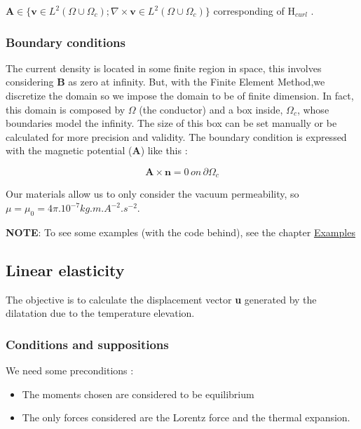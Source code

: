 \documentclass[11pt]{amsart}
\newcommand{\admonition}[2]{\textbf{#1}: {#2}}
\begin{document}
$\textbf{A}\in\{\textbf{v}\in L^{2}(\Omega\cup\Omega_{c}); \nabla\times\textbf{v}\in L^{2}(\Omega\cup\Omega_{c})\}$
corresponding of H${}_{curl}$ .


\hypertarget{x-boundary-conditions}{\subsubsection{Boundary conditions}}
The current density is located in some finite region in space, this involves considering \textbf{B} as zero at infinity.
But, with the Finite Element Method,we discretize the domain so we impose the domain to be of finite dimension.
In fact, this domain is composed by $\Omega$ (the conductor) and a box inside, $\Omega_{c}$, whose boundaries model the infinity.
The size of this box can be set manually or be calculated for more precision and validity.
The boundary condition is expressed with the magnetic potential (\textbf{A}) like this :



\[
\textbf{A}\times\textbf{n}=0\, on\, \partial\Omega_{c}
\]



Our materials allow us to only consider the vacuum permeability, so $\mu=\mu_{0}=4\pi.10^{-7} kg.m.A^{-2} .s^{-2}$.


\admonition{NOTE}{To see some examples (with the code behind), see the chapter \href{/examples}{Examples}}
\hypertarget{x-linear-elasticity}{\subsection{Linear elasticity}}
The objective is to calculate the displacement vector \textbf{u} generated by the dilatation due to the temperature elevation.


\hypertarget{x-conditions-and-suppositions}{\subsubsection{Conditions and suppositions}}
We need some preconditions :


\begin{itemize}

\item The moments chosen are considered to be equilibrium

\item The only forces considered are the Lorentz force and the thermal expansion.

\end{itemize}
\end{document}
